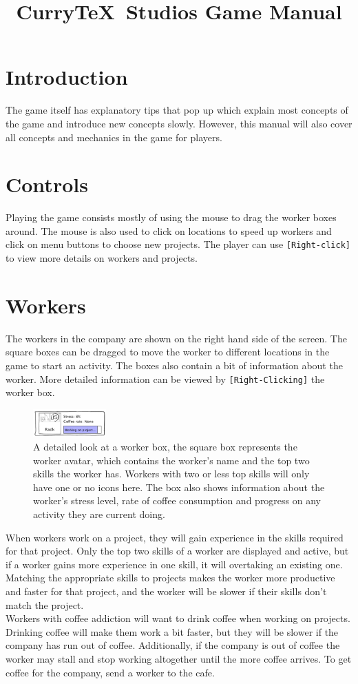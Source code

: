 \documentclass[11pt]{article}
\author{}
\date{}
\title{Curry\TeX\ Studios Game Manual}
\newcommand{\n}[0]{\\[\baselineskip]}
\begin{document}
\begin{multicols}{2}
\section{Introduction}
\noindent
The game itself has explanatory tips that pop up which explain most concepts of the game and introduce new concepts slowly. However, this manual will also cover all concepts and mechanics in the game for players.

\section{Controls}
\noindent
Playing the game consists mostly of using the mouse to drag the worker boxes around. The mouse is also used to click on locations to speed up workers and click on menu buttons to choose new projects. The player can use \texttt{[Right-click]} to view more details on workers and projects. 

\section{Workers}
\noindent
The workers in the company are shown on the right hand side of the screen. The square boxes can be dragged to move the worker to different locations in the game to start an activity. The boxes also contain a bit of information about the worker. More detailed information can be viewed by \texttt{[Right-Clicking]} the worker box.
\begin{figure}[H]
\centering
\includegraphics[width=0.25\textwidth]{imgs/worker.png}
\caption{A detailed look at a worker box, the square box represents the worker avatar, which contains the worker's name and the top two skills the worker has. Workers with two or less top skills will only have one or no icons here. The box also shows information about the worker's stress level, rate of coffee consumption and progress on any activity they are current doing.}
\end{figure}
\noindent
When workers work on a project, they will gain experience in the skills required for that project. Only the top two skills of a worker are displayed and active, but if a worker gains more experience in one skill, it will overtaking an existing one. Matching the appropriate skills to projects makes the worker more productive and faster for that project, and the worker will be slower if their skills don't match the project. 
\n
Workers with coffee addiction will want to drink coffee when working on projects. Drinking coffee will make them work a bit faster, but they will be slower if the company has run out of coffee. Additionally, if the company is out of coffee the worker may stall and stop working altogether until the more coffee arrives. To get coffee for the company, send a worker to the cafe.


\end{multicols}
\end{document}
